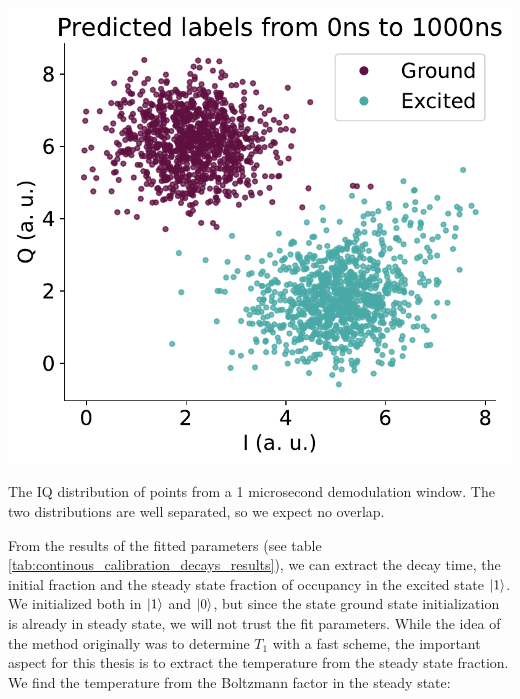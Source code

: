 \begin{marginfigure}
    \centering
    \includegraphics{projects/in_measurement_calibration/Distributions_long_pulse.pdf}
    \caption{The IQ distribution of points from a 1 microsecond demodulation window. The two distributions are well separated, so we expect no overlap.}
    \label{fig:IQ_distribution_temp}
\end{marginfigure}
From the results of the fitted parameters (see table \ref{tab:continous_calibration_decays_results}), we can extract the decay time, the initial fraction and the steady state fraction of occupancy in the excited state $\ket{1}$. We initialized both in $\ket{1}$ and $\ket{0}$, but since the state ground state initialization is already in steady state, we will not trust the fit parameters. While the idea of the method originally was to determine $T_1$ with a fast scheme, the important aspect for this thesis is to extract the temperature from the steady state fraction. We find the temperature from the Boltzmann factor in the steady state:
